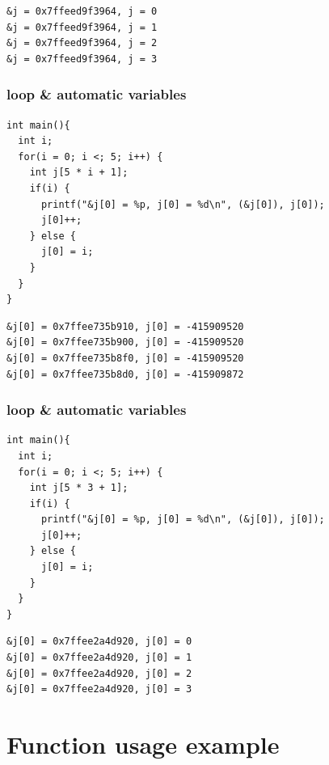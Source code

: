 \documentclass{../c-lecture}
\begin{document}
\begin{frame}[fragile]
  \begin{verbatim}
&j = 0x7ffeed9f3964, j = 0
&j = 0x7ffeed9f3964, j = 1
&j = 0x7ffeed9f3964, j = 2
&j = 0x7ffeed9f3964, j = 3
  \end{verbatim}
\end{frame}

\begin{frame}[fragile]
  \frametitle{loop \& automatic variables}
  \begin{verbatim}
int main(){
  int i;
  for(i = 0; i <; 5; i++) {
    int j[5 * i + 1];
    if(i) {
      printf("&j[0] = %p, j[0] = %d\n", (&j[0]), j[0]);
      j[0]++;
    } else {
      j[0] = i;
    }
  }
}
  \end{verbatim}
\end{frame}

\begin{frame}[fragile]
  \begin{verbatim}
&j[0] = 0x7ffee735b910, j[0] = -415909520
&j[0] = 0x7ffee735b900, j[0] = -415909520
&j[0] = 0x7ffee735b8f0, j[0] = -415909520
&j[0] = 0x7ffee735b8d0, j[0] = -415909872
  \end{verbatim}
\end{frame}

\begin{frame}[fragile]
  \frametitle{loop \& automatic variables}
  \begin{verbatim}
int main(){
  int i;
  for(i = 0; i <; 5; i++) {
    int j[5 * 3 + 1];
    if(i) {
      printf("&j[0] = %p, j[0] = %d\n", (&j[0]), j[0]);
      j[0]++;
    } else {
      j[0] = i;
    }
  }
}
  \end{verbatim}
\end{frame}

\begin{frame}[fragile]
  \begin{verbatim}
&j[0] = 0x7ffee2a4d920, j[0] = 0
&j[0] = 0x7ffee2a4d920, j[0] = 1
&j[0] = 0x7ffee2a4d920, j[0] = 2
&j[0] = 0x7ffee2a4d920, j[0] = 3
  \end{verbatim}
\end{frame}

\section{Function usage example}
\end{document}
